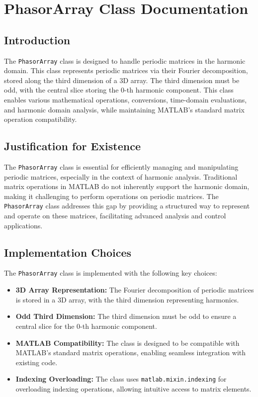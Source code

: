 \chapter{PhasorArray Class Documentation}

\section{Introduction}
The \texttt{PhasorArray} class is designed to handle periodic matrices in the harmonic domain. This class represents periodic matrices via their Fourier decomposition, stored along the third dimension of a 3D array. The third dimension must be odd, with the central slice storing the 0-th harmonic component. This class enables various mathematical operations, conversions, time-domain evaluations, and harmonic domain analysis, while maintaining MATLAB's standard matrix operation compatibility.

\section{Justification for Existence}
The \texttt{PhasorArray} class is essential for efficiently managing and manipulating periodic matrices, especially in the context of harmonic analysis. Traditional matrix operations in MATLAB do not inherently support the harmonic domain, making it challenging to perform operations on periodic matrices. The \texttt{PhasorArray} class addresses this gap by providing a structured way to represent and operate on these matrices, facilitating advanced analysis and control applications.

\section{Implementation Choices}
The \texttt{PhasorArray} class is implemented with the following key choices:
\begin{itemize}
    \item \textbf{3D Array Representation:} The Fourier decomposition of periodic matrices is stored in a 3D array, with the third dimension representing harmonics.
    \item \textbf{Odd Third Dimension:} The third dimension must be odd to ensure a central slice for the 0-th harmonic component.
    \item \textbf{MATLAB Compatibility:} The class is designed to be compatible with MATLAB's standard matrix operations, enabling seamless integration with existing code.
    \item \textbf{Indexing Overloading:} The class uses \texttt{matlab.mixin.indexing} for overloading indexing operations, allowing intuitive access to matrix elements.
\end{itemize}

